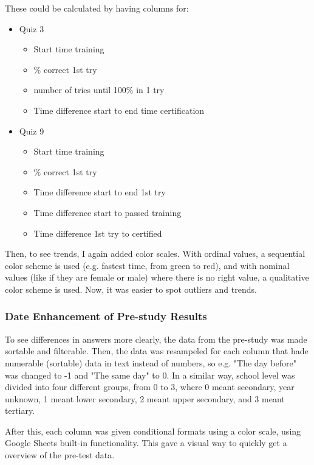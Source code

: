 These could be calculated by having columns for:

\begin{itemize}
  \item Quiz 3
  \begin{itemize}
    \item Start time training
    \item \% correct 1st try
    \item number of tries until 100\% in 1 try
    \item Time difference start to end time certification
  \end{itemize}
  \item Quiz 9
  \begin{itemize}
    \item Start time training
    \item \% correct 1st try
    \item Time difference start to end 1st try
    \item Time difference start to passed training
    \item Time difference 1st try to certified
  \end{itemize}
\end{itemize}

Then, to see trends, I again added color scales. With ordinal values, a sequential color scheme is used (e.g. fastest time, from green to red), and with nominal values (like if they are female or male) where there is no right value, a qualitative color scheme is used. Now, it was easier to spot outliers and trends.

\subsubsection{Date Enhancement of Pre-study Results}
To see differences in answers more clearly, the data from the pre-study was made sortable and filterable. Then, the data was resampeled for each column that hade numerable (sortable) data in text instead of numbers, so e.g. "The day before" was changed to -1 and "The same day" to 0. In a similar way, school level was divided into four different groups, from 0 to 3, where 0 meant secondary, year unknown, 1 meant lower secondary, 2 meant upper secondary, and 3 meant tertiary.

After this, each column was given conditional formats using a color scale, using Google Sheets built-in functionality. This gave a visual way to quickly get a overview of the pre-test data.

